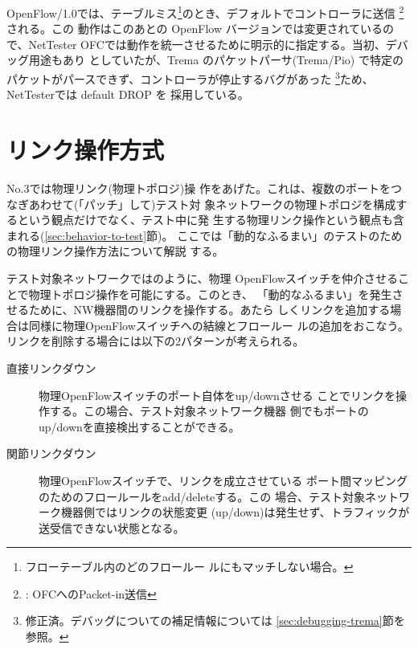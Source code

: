 OpenFlow/1.0では、テーブルミス\footnote{フローテーブル内のどのフロールー
ルにもマッチしない場合。}のとき、デフォルトでコントローラに送信
\footnote{ : OFCへのPacket-in送信}される。この
動作はこのあとの OpenFlow バージョンでは変更されているので、NetTester
OFCでは動作を統一させるために明示的に指定する。当初、デバッグ用途もあり
としていたが、Trema のパケットパーサ(Trema/Pio)
で特定のパケットがパースできず、コントローラが停止するバグがあった
\footnote{修正済。デバッグについての補足情報については
\ref{sec:debugging-trema}節を参照。}ため、NetTesterでは default DROP を
採用している。

  \section{リンク操作方式}
  \label{sec:link-operation}



 No.3では物理リンク(物理トポロジ)操
作をあげた。これは、複数のポートをつなぎあわせて(「パッチ」して)テスト対
象ネットワークの物理トポロジを構成するという観点だけでなく、テスト中に発
生する物理リンク操作という観点も含まれる(\ref{sec:behavior-to-test}節)。
ここでは「動的なふるまい」のテストのための物理リンク操作方法について解説
する。

テスト対象ネットワークではのように、物理
OpenFlowスイッチを仲介させることで物理トポロジ操作を可能にする。このとき、
「動的なふるまい」を発生させるために、NW機器間のリンクを操作する。あたら
しくリンクを追加する場合は同様に物理OpenFlowスイッチへの結線とフロールー
ルの追加をおこなう。リンクを削除する場合には以下の2パターンが考えられる。
\begin{description}
 \item[直接リンクダウン] 物理OpenFlowスイッチのポート自体をup/downさせる
            ことでリンクを操作する。この場合、テスト対象ネットワーク機器
            側でもポートのup/downを直接検出することができる。
 \item[関節リンクダウン] 物理OpenFlowスイッチで、リンクを成立させている
            ポート間マッピングのためのフロールールをadd/deleteする。この
            場合、テスト対象ネットワーク機器側ではリンクの状態変更
            (up/down)は発生せず、トラフィックが送受信できない状態となる。
\end{description}

